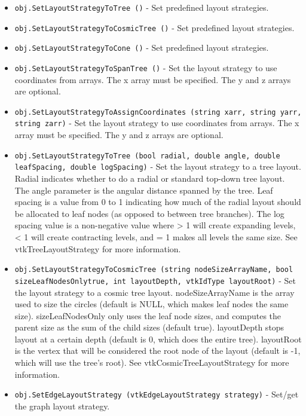 \begin{itemize}
\item  \verb|obj.SetLayoutStrategyToTree ()| -  Set predefined layout strategies.

\item  \verb|obj.SetLayoutStrategyToCosmicTree ()| -  Set predefined layout strategies.

\item  \verb|obj.SetLayoutStrategyToCone ()| -  Set predefined layout strategies.

\item  \verb|obj.SetLayoutStrategyToSpanTree ()| -  Set the layout strategy to use coordinates from arrays.
 The x array must be specified. The y and z arrays are optional.

\item  \verb|obj.SetLayoutStrategyToAssignCoordinates (string xarr, string yarr, string zarr)| -  Set the layout strategy to use coordinates from arrays.
 The x array must be specified. The y and z arrays are optional.

\item  \verb|obj.SetLayoutStrategyToTree (bool radial, double angle, double leafSpacing, double logSpacing)| -  Set the layout strategy to a tree layout. Radial indicates whether to
 do a radial or standard top-down tree layout. The angle parameter is the
 angular distance spanned by the tree. Leaf spacing is a
 value from 0 to 1 indicating how much of the radial layout should be
 allocated to leaf nodes (as opposed to between tree branches). The log spacing value is a
 non-negative value where > 1 will create expanding levels, < 1 will create
 contracting levels, and = 1 makes all levels the same size. See
 vtkTreeLayoutStrategy for more information.

\item  \verb|obj.SetLayoutStrategyToCosmicTree (string nodeSizeArrayName, bool sizeLeafNodesOnlytrue, int layoutDepth, vtkIdType layoutRoot)| -  Set the layout strategy to a cosmic tree layout. nodeSizeArrayName is
 the array used to size the circles (default is NULL, which makes leaf
 nodes the same size). sizeLeafNodesOnly only uses the leaf node sizes,
 and computes the parent size as the sum of the child sizes (default true).
 layoutDepth stops layout at a certain depth (default is 0, which does the
 entire tree). layoutRoot is the vertex that will be considered the root
 node of the layout (default is -1, which will use the tree's root).
 See vtkCosmicTreeLayoutStrategy for more information.

\item  \verb|obj.SetEdgeLayoutStrategy (vtkEdgeLayoutStrategy strategy)| -  Set/get the graph layout strategy.


\end{itemize}
